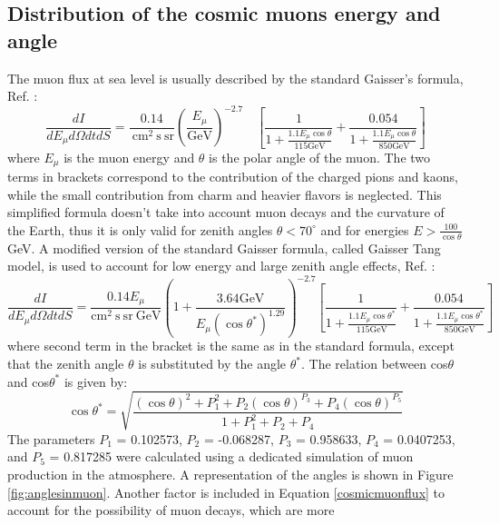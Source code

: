 \subsection{Distribution of the cosmic muons energy and angle}
The muon flux at sea level is usually described by the standard Gaisser's formula, Ref. \cite{guan2015parametrization}:
\begin{equation}
    \frac{d I}{d E_\mu d \Omega d t d S}=\frac{0.14}{\mathrm{~cm}^2 \mathrm{~s} \ \mathrm{sr}}\left(\frac{E_\mu}{\mathrm{GeV}}\right)^{-2.7} \quad\left[\frac{1}{1+\frac{1.1 E_\mu \cos \theta}{115 \mathrm{GeV}}}+\frac{0.054}{1+\frac{1.1 E_\mu \cos \theta}{850 \mathrm{GeV}}}\right]
    \end{equation}
where $E_\mu$ is the muon energy and $\theta$ is the polar angle of the muon. 
The two terms in brackets correspond to the contribution of the charged pions and kaons, while 
the small contribution from charm and heavier flavors is neglected. 
This simplified formula doesn't take into account muon decays and the curvature of the Earth, 
thus it is only valid for zenith angles $\theta < 70^\circ$ and for energies $E > \frac{100}{\cos \theta}$ GeV.
A modified version of the standard Gaisser formula, called Gaisser Tang model, is used to account for low energy and large zenith angle effects, Ref. \cite{guan2015parametrization}:
\begin{equation}\label{cosmicmuonflux}
    \frac{d I}{d E_\mu d \Omega d t d S}=\frac{0.14 E_\mu}{\mathrm{cm}^2 \mathrm{~s} \ \mathrm{sr} \ \mathrm{GeV}}\left(1+\frac{3.64 \mathrm{GeV}}{E_\mu\left(\cos \theta^*\right)^{1.29}}\right)^{-2.7}\left[\frac{1}{1+\frac{1.1 E_\mu \cos \theta^*}{115 \mathrm{GeV}}}+\frac{0.054}{1+\frac{1.1 E_\mu \cos \theta^*}{850 \mathrm{GeV}}}\right]
\end{equation}
where second term in the bracket is the same as in the standard formula, except that the zenith angle 
$\theta$ is substituted by the angle $\theta^*$. The relation between cos$\theta$
and cos$\theta^*$ is given by:
\begin{equation}
    \cos \theta^*=\sqrt{\frac{(\cos \theta)^2+P_1^2+P_2(\cos \theta)^{P_3}+P_4(\cos \theta)^{P_5}}{1+P_1^2+P_2+P_4}}
    \end{equation}
The parameters $P_1$ = 0.102573, $P_2$ = -0.068287, $P_3$ = 0.958633, $P_4$ = 0.0407253, and $P_5$ = 0.817285 were calculated using 
a dedicated simulation of muon production in the atmosphere. A representation of the angles is shown in Figure \ref{fig:anglesinmuon}.
Another factor is included in Equation \ref{cosmicmuonflux} to account for the possibility of muon decays, which are more 

